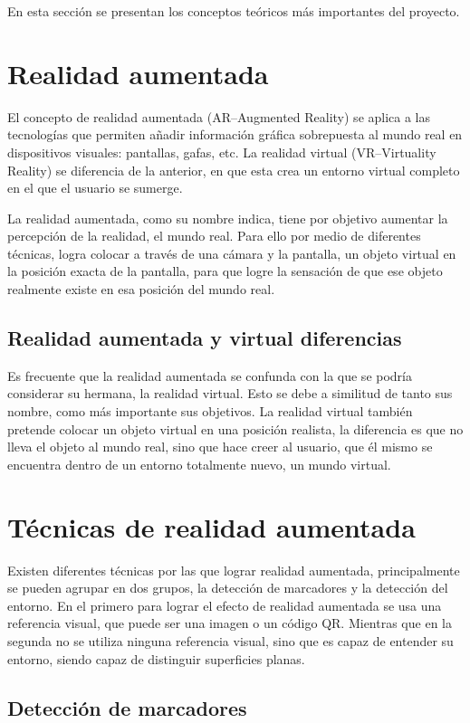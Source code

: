 En esta sección se presentan los conceptos teóricos más importantes del proyecto.

\section{Realidad aumentada}

El concepto de realidad aumentada (AR--Augmented Reality) se aplica a las tecnologías que permiten añadir información gráfica sobrepuesta al mundo real en dispositivos visuales: pantallas, gafas, etc.
La realidad virtual (VR--Virtuality Reality) se diferencia de la anterior, en que esta crea un entorno virtual completo en el que el usuario se sumerge.

La realidad aumentada, como su nombre indica, tiene por objetivo aumentar la percepción de la realidad, el mundo real. Para ello por medio de diferentes técnicas, logra colocar a través de una cámara y la pantalla, un objeto virtual en la posición exacta de la pantalla, para que logre la sensación de que ese objeto realmente existe en esa posición del mundo real.

\subsection{Realidad aumentada y virtual diferencias} 
Es frecuente que la realidad aumentada se confunda con la que se podría considerar su hermana, la realidad virtual. Esto se debe a similitud de tanto sus nombre, como más importante sus objetivos. La realidad virtual también pretende colocar un objeto virtual en una posición realista, la diferencia es que no lleva el objeto al mundo real, sino que hace creer al usuario, que él mismo se encuentra dentro de un entorno totalmente nuevo, un mundo virtual.

\section{Técnicas de realidad aumentada}
Existen diferentes técnicas por las que lograr realidad aumentada, principalmente se pueden agrupar en dos grupos, la detección de marcadores y la detección del entorno. En el primero para lograr el efecto de realidad aumentada se usa una referencia visual, que puede ser una imagen o un código QR. Mientras que en la segunda no se utiliza ninguna referencia visual, sino que es capaz de entender su entorno, siendo capaz de distinguir superficies planas.

\subsection{Detección de marcadores}

